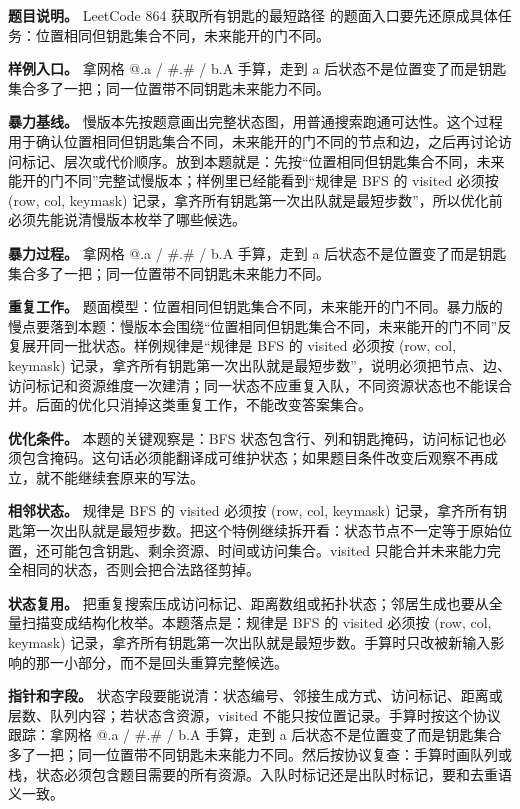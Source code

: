 \textbf{题目说明。} LeetCode 864 获取所有钥匙的最短路径 的题面入口要先还原成具体任务：位置相同但钥匙集合不同，未来能开的门不同。

\textbf{样例入口。} 拿网格 @.a / \#.\# / b.A 手算，走到 a 后状态不是位置变了而是钥匙集合多了一把；同一位置带不同钥匙未来能力不同。

\textbf{暴力基线。} 慢版本先按题意画出完整状态图，用普通搜索跑通可达性。这个过程用于确认位置相同但钥匙集合不同，未来能开的门不同的节点和边，之后再讨论访问标记、层次或代价顺序。放到本题就是：先按“位置相同但钥匙集合不同，未来能开的门不同”完整试慢版本；样例里已经能看到“规律是 BFS 的 visited 必须按 (row, col, keymask) 记录，拿齐所有钥匙第一次出队就是最短步数”，所以优化前必须先能说清慢版本枚举了哪些候选。

\textbf{暴力过程。} 拿网格 @.a / \#.\# / b.A 手算，走到 a 后状态不是位置变了而是钥匙集合多了一把；同一位置带不同钥匙未来能力不同。

\textbf{重复工作。} 题面模型：位置相同但钥匙集合不同，未来能开的门不同。暴力版的慢点要落到本题：慢版本会围绕“位置相同但钥匙集合不同，未来能开的门不同”反复展开同一批状态。样例规律是“规律是 BFS 的 visited 必须按 (row, col, keymask) 记录，拿齐所有钥匙第一次出队就是最短步数”，说明必须把节点、边、访问标记和资源维度一次建清；同一状态不应重复入队，不同资源状态也不能误合并。后面的优化只消掉这类重复工作，不能改变答案集合。

\textbf{优化条件。} 本题的关键观察是：BFS 状态包含行、列和钥匙掩码，访问标记也必须包含掩码。这句话必须能翻译成可维护状态；如果题目条件改变后观察不再成立，就不能继续套原来的写法。

\textbf{相邻状态。} 规律是 BFS 的 visited 必须按 (row, col, keymask) 记录，拿齐所有钥匙第一次出队就是最短步数。把这个特例继续拆开看：状态节点不一定等于原始位置，还可能包含钥匙、剩余资源、时间或访问集合。visited 只能合并未来能力完全相同的状态，否则会把合法路径剪掉。

\textbf{状态复用。} 把重复搜索压成访问标记、距离数组或拓扑状态；邻居生成也要从全量扫描变成结构化枚举。本题落点是：规律是 BFS 的 visited 必须按 (row, col, keymask) 记录，拿齐所有钥匙第一次出队就是最短步数。手算时只改被新输入影响的那一小部分，而不是回头重算完整候选。

\textbf{指针和字段。} 状态字段要能说清：状态编号、邻接生成方式、访问标记、距离或层数、队列内容；若状态含资源，visited 不能只按位置记录。手算时按这个协议跟踪：拿网格 @.a / \#.\# / b.A 手算，走到 a 后状态不是位置变了而是钥匙集合多了一把；同一位置带不同钥匙未来能力不同。然后按协议复查：手算时画队列或栈，状态必须包含题目需要的所有资源。入队时标记还是出队时标记，要和去重语义一致。

